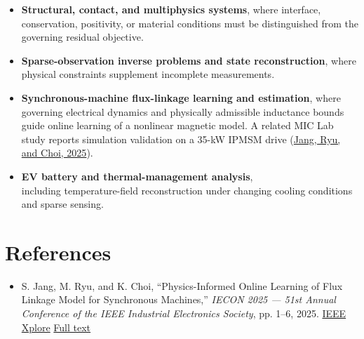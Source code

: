 \documentclass[a4paper]{article}
\begin{document}
\begin{itemize}
  \item \textbf{Structural, contact, and multiphysics systems}, where interface,
  conservation, positivity, or material conditions must be distinguished
  from the governing residual objective.
  \item \textbf{Sparse-observation inverse problems and state reconstruction}, where
  physical constraints supplement incomplete measurements.
  \item \textbf{Synchronous-machine flux-linkage learning and estimation}, where
  governing electrical dynamics and physically admissible inductance bounds
  guide online learning of a nonlinear magnetic model. A related MIC Lab study
  reports simulation validation on a 35-kW IPMSM drive
  (\href{https://ieeexplore.ieee.org/document/11221587/}{Jang, Ryu, and Choi, 2025}).
  \item \textbf{EV battery and thermal-management analysis},\\
  including temperature-field
  reconstruction under changing cooling conditions and sparse sensing.
\end{itemize}

\section{References}

\begin{itemize}
  \item S. Jang, M. Ryu, and K. Choi, ``Physics-Informed Online Learning of Flux
  Linkage Model for Synchronous Machines,'' \textit{IECON 2025 --- 51st Annual
  Conference of the IEEE Industrial Electronics Society}, pp. 1--6, 2025.
  \href{https://ieeexplore.ieee.org/document/11221587/}{IEEE Xplore}
  \quad \href{https://kaist-mic-lab.github.io/static/pub/2025-physics-informed-IECON.pdf}{Full text}
\end{itemize}
\end{document}
